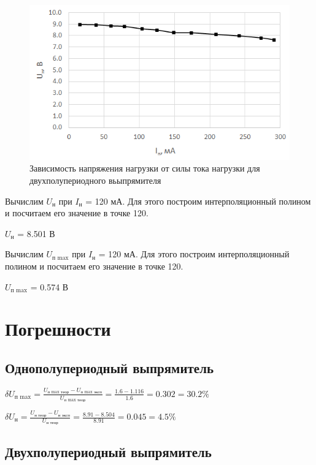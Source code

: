 \begin{figure}[H]
	\begin{center}
		\includegraphics[width=15cm]{img/5}
		\caption{Зависимость напряжения нагрузки от силы тока нагрузки для двухполупериодного вьыпрямителя}
		\label{g:5} %
	\end{center}
\end{figure}

Вычислим $U_\text{н}$ при $I_\text{н}$ = 120 мА. Для этого построим интерполяционный полином и посчитаем его значение в точке 120.

$U_\text{н}$ = 8.501 В

Вычислим $U_\text{п max}$ при $I_\text{н}$ = 120 мА. Для этого построим интерполяционный полином и посчитаем его значение в точке 120.

$U_\text{п max}$ = 0.574 В

\section{Погрешности}


\subsection{Однополупериодный выпрямитель}

$\delta U_\text{п max} = \frac{U_\text{п max\ \ теор} - U_\text{п max\ \ эксп}}{U_\text{п max\ \ теор}} = \frac{1.6 - 1.116}{1.6} = 0.302 = 30.2 \%$

$\delta U_\text{н} = \frac{U_\text{н\ \ теор} - U_\text{н\ \ эксп}}{U_\text{н\ \ теор}} = \frac{8.91 - 8.504}{8.91} = 0.045 = 4.5 \%$

\subsection{Двухполупериодный выпрямитель}

